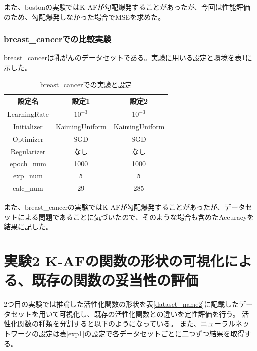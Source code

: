 また、bostonの実験ではK-AFが勾配爆発することがあったが、今回は性能評価のため、勾配爆発しなかった場合でMSEを求めた。


\subsubsection{breast\_cancerでの比較実験}
\label{impl:breastcancer}

breast\_cancerは乳がんのデータセットである。実験に用いる設定と環境を表\ref{exp:breastcancer}に示した。

\begin{table}[htbp]
    \begin{center}
        \caption{breast\_cancerでの実験と設定}
        \label{exp:breastcancer}
        \vspace{2mm} 
        \begin{tabular}{ |c|c|c| }
        \hline
        設定名 & 設定1 & 設定2 \\
        \hline
        LearningRate         & $ 10^{-3} $ & $ 10^{-3} $ \\
        \hline
        Initializer       & KaimingUniform & KaimingUniform \\
        \hline
        Optimizer           & SGD & SGD \\
        \hline
        Regularizer     & なし & なし \\
        \hline
        epoch\_num       & 1000 &  1000 \\
        \hline
        exp\_num         & 5 & 5 \\
        \hline
        calc\_num        & 29 & 285 \\
        \hline
        \end{tabular}
    \end{center}
\end{table}

また、breast\_cancerの実験ではK-AFが勾配爆発することがあったが、データセットによる問題であることに気づいたので、そのような場合も含めたAccuracyを結果に記した。

\vspace{-5mm} 

\section{実験2 K-AFの関数の形状の可視化による、既存の関数の妥当性の評価}
\label{exp2}

2つ目の実験では推論した活性化関数の形状を表\ref{dataset_name2}に記載したデータセットを用いて可視化し、既存の活性化関数との違いを定性評価を行う。
活性化関数の種類を分割すると以下のようになっている。
また、ニューラルネットワークの設定は表\ref{exp1}の設定で各データセットごとに二つずつ結果を取得する。

